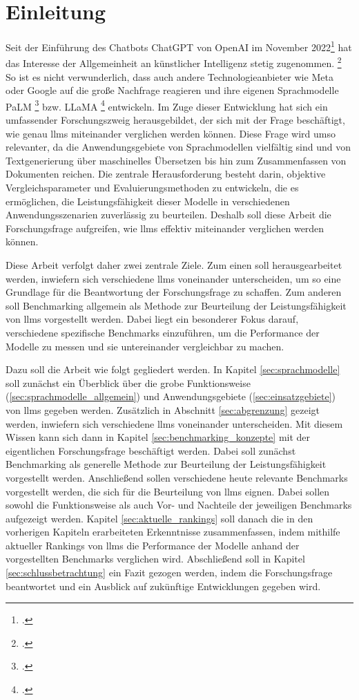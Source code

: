 \section{Einleitung} \label{sec:einleitung}
Seit der Einführung des Chatbots ChatGPT von OpenAI im November 2022\footcite[Vgl.][]{ChatGPT-announcement} hat das Interesse der Allgemeinheit an künstlicher Intelligenz stetig zugenommen. \footcite[Vgl.][]{google_trends_ki}
So ist es nicht verwunderlich, dass auch andere Technologieanbieter wie Meta oder Google auf die große Nachfrage reagieren und ihre eigenen Sprachmodelle PaLM \footcite[Vgl.][S. 1]{anil2023palm} bzw. LLaMA \footcite[Vgl.][S. 1]{touvron2023llama} entwickeln.
Im Zuge dieser Entwicklung hat sich ein umfassender Forschungszweig herausgebildet, der sich mit der Frage beschäftigt, wie genau \acp{llm} miteinander verglichen werden können.
Diese Frage wird umso relevanter, da die Anwendungsgebiete von Sprachmodellen vielfältig sind und von Textgenerierung über maschinelles Übersetzen bis hin zum Zusammenfassen von Dokumenten reichen.
Die zentrale Herausforderung besteht darin, objektive Vergleichsparameter und Evaluierungsmethoden zu entwickeln, die es ermöglichen, die Leistungsfähigkeit dieser Modelle in verschiedenen Anwendungsszenarien zuverlässig zu beurteilen.
Deshalb soll diese Arbeit die Forschungsfrage aufgreifen, wie \acp{llm} effektiv miteinander verglichen werden können.

Diese Arbeit verfolgt daher zwei zentrale Ziele. Zum einen soll herausgearbeitet werden, inwiefern sich verschiedene \acp{llm} voneinander unterscheiden, um so eine Grundlage für die Beantwortung der Forschungsfrage zu schaffen.
Zum anderen soll Benchmarking allgemein als Methode zur Beurteilung der Leistungsfähigkeit von \acp{llm} vorgestellt werden.
Dabei liegt ein besonderer Fokus darauf, verschiedene spezifische Benchmarks einzuführen, um die Performance der Modelle zu messen und sie untereinander vergleichbar zu machen.

Dazu soll die Arbeit wie folgt gegliedert werden.
In Kapitel \ref{sec:sprachmodelle} soll zunächst ein Überblick über die grobe Funktionsweise (\ref{sec:sprachmodelle_allgemein}) und Anwendungsgebiete (\ref{sec:einsatzgebiete}) von \acp{llm} gegeben werden. Zusätzlich in Abschnitt \ref{sec:abgrenzung} gezeigt werden, inwiefern sich verschiedene \acp{llm} voneinander unterscheiden.
Mit diesem Wissen kann sich dann in Kapitel \ref{sec:benchmarking_konzepte} mit der eigentlichen Forschungsfrage beschäftigt werden.
Dabei soll zunächst Benchmarking als generelle Methode zur Beurteilung der Leistungsfähigkeit vorgestellt werden.
Anschließend sollen verschiedene heute relevante Benchmarks vorgestellt werden, die sich für die Beurteilung von \acp{llm} eignen.
Dabei sollen sowohl die Funktionsweise als auch Vor- und Nachteile der jeweiligen Benchmarks aufgezeigt werden.
Kapitel \ref{sec:aktuelle_rankings} soll danach die in den vorherigen Kapiteln erarbeiteten Erkenntnisse zusammenfassen, indem mithilfe aktueller Rankings von \acp{llm} die Performance der Modelle anhand der vorgestellten Benchmarks verglichen wird.
Abschließend soll in Kapitel \ref{sec:schlussbetrachtung} ein Fazit gezogen werden, indem die Forschungsfrage beantwortet und ein Ausblick auf zukünftige Entwicklungen gegeben wird.

